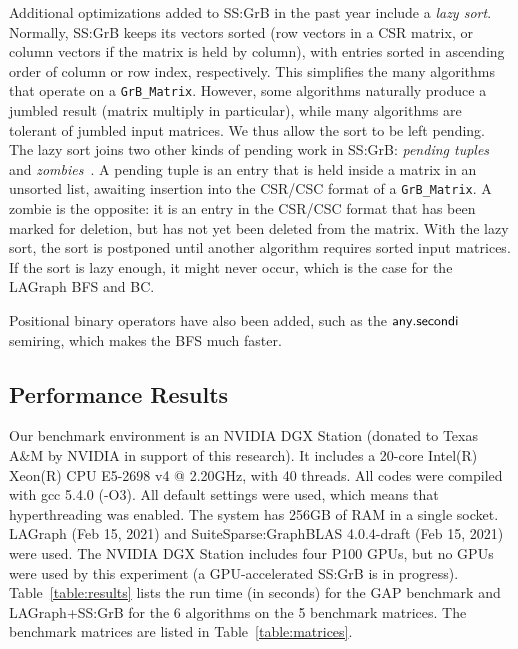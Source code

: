 Additional optimizations added to SS:GrB in the past year include a {\em lazy
sort}.  Normally, SS:GrB keeps its vectors sorted (row vectors in a CSR matrix,
or column vectors if the matrix is held by column), with entries sorted in
ascending order of column or row index, respectively.  This simplifies the many
algorithms that operate on a \verb'GrB_Matrix'.  However, some algorithms
naturally produce a jumbled result (matrix multiply in particular), while many
algorithms are tolerant of jumbled input matrices.  We thus allow the sort to
be left pending.  The lazy sort joins two other kinds of pending work in
SS:GrB: {\em pending tuples} and {\em zombies}~\cite{DBLP:journals/toms/Davis19}.
A pending tuple is an entry
that is held inside a matrix in an unsorted list, awaiting insertion into the
CSR/CSC format of a \verb'GrB_Matrix'.  A zombie is the opposite: it is an
entry in the CSR/CSC format that has been marked for deletion, but has not yet
been deleted from the matrix.  With the lazy sort, the sort is postponed until
another algorithm requires sorted input matrices.  If the sort is lazy enough,
it might never occur, which is the case for the LAGraph BFS and BC.

Positional binary operators have also been added,
such as the $\mathbin{\mathsf{any.secondi}}$ semiring, %
which makes the BFS much faster.

\subsection{Performance Results}

Our benchmark environment is an NVIDIA DGX Station (donated to Texas A\&M by
NVIDIA in support of this research).  It includes a 20-core Intel(R) Xeon(R)
CPU E5-2698 v4 @ 2.20GHz, with 40 threads.  All codes were compiled with gcc
5.4.0 (-O3).  All default settings were used, which means that hyperthreading
was enabled.  The system has 256GB of RAM in a single socket.
LAGraph (Feb 15, 2021) and SuiteSparse:GraphBLAS 4.0.4-draft (Feb 15, 2021) were
used.  The NVIDIA DGX Station includes four P100 GPUs, but no GPUs were used by
this experiment (a GPU-accelerated SS:GrB is in progress).
Table~\ref{table:results} lists the run time (in seconds) for the GAP benchmark
and LAGraph+SS:GrB for the 6 algorithms on the 5 benchmark matrices.
The benchmark matrices are listed in Table~\ref{table:matrices}.

